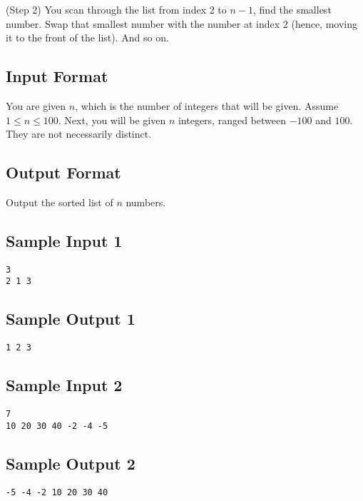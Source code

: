 (Step 2) You scan through the list from index $2$ to $n-1$, find the smallest number. Swap that smallest number with the number at index $2$ (hence, moving it to the front of the list). And so on.

\subsection*{Input Format}
You are given $n$, which is the number of integers that will be given. Assume $1 \leq n \leq 100$.
Next, you will be given $n$ integers, ranged between $-100$ and $100$. They are not necessarily distinct. 

\subsection*{Output Format}
Output the sorted list of $n$ numbers.

\subsection*{Sample Input 1}
\begin{verbatim}
3
2 1 3
\end{verbatim}

\subsection*{Sample Output 1}
\begin{verbatim}
1 2 3
\end{verbatim}

\subsection*{Sample Input 2}
\begin{verbatim}
7
10 20 30 40 -2 -4 -5 
\end{verbatim}

\subsection*{Sample Output 2}
\begin{verbatim}
-5 -4 -2 10 20 30 40
\end{verbatim}



